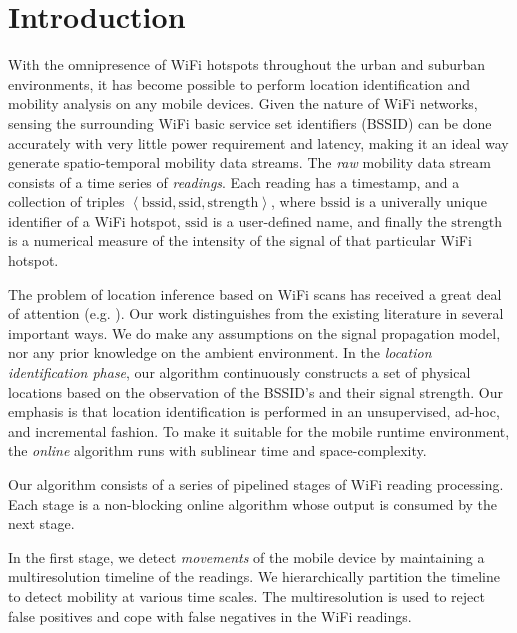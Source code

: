 \section{Introduction}

With the omnipresence of WiFi hotspots throughout the urban and suburban
environments, it has become possible to perform location identification and
mobility analysis on any mobile devices.  Given the nature of WiFi networks,
sensing the surrounding WiFi basic service set identifiers (BSSID) can be done
accurately with very little power requirement and latency, making it an ideal
way generate spatio-temporal mobility data streams.  The {\em raw} mobility data
stream consists of a time series of {\em readings}.  Each reading has a
timestamp, and a collection of triples $\left<\mathrm{bssid}, \mathrm{ssid},
\mathrm{strength}\right>$, where $\mathrm{bssid}$ is a univerally unique
identifier of a WiFi hotspot, $\mathrm{ssid}$ is a user-defined name, and
finally the $\mathrm{strength}$ is a numerical measure of the intensity of the
signal of that particular WiFi hotspot.


The problem of location inference based on WiFi scans has received a great deal
of attention (e.g. \cite{xxx}).  Our work distinguishes from the existing
literature in several important ways.  We do make any assumptions on the signal
propagation model, nor any prior knowledge on the ambient environment.  In the
{\em location identification phase}, our
algorithm continuously constructs a set of physical locations based on the
observation of the BSSID's and their signal strength.  Our emphasis is that
location identification is performed in an unsupervised, ad-hoc, and incremental
fashion.  To make it suitable for the mobile runtime environment, the {\em
online} algorithm runs with sublinear time and space-complexity.


Our algorithm consists of a series of pipelined stages of WiFi reading
processing.  Each stage is a non-blocking online algorithm whose output is
consumed by the next stage.  


In the first stage, we detect {\em movements}
of the mobile device by maintaining a multiresolution timeline of the readings.  We
hierarchically partition the timeline to detect mobility at various time scales.
The multiresolution is used to reject false positives and cope with false
negatives in the WiFi readings.

